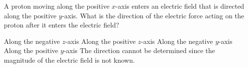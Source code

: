 \begin{questions}\setcounter{question}{0}\question
A proton moving along the positive $x$-axis enters an electric field that is directed along the positive $y$-axis. What is the direction of the electric force acting on the proton after it enters the electric field?

\begin{choices}
\choice Along the negative $z$-axis
\choice Along the positive $z$-axis
\choice Along the negative $y$-axis
\choice Along the positive $y$-axis
\choice The direction cannot be determined since the magnitude of the electric field is not  known.
\end{choices}\end{questions}

